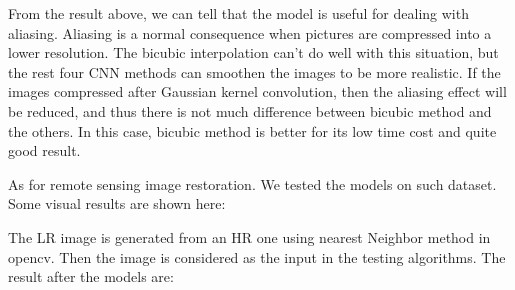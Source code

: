 \documentclass{article}
\begin{document}
  From the result above, we can tell that the model is useful for dealing with aliasing.
  Aliasing is a normal consequence when pictures are compressed into a lower resolution.
  The bicubic interpolation can't do well with this situation, 
  but the rest four CNN methods can smoothen the images to be more realistic.
  If the images compressed after Gaussian kernel convolution,
  then the aliasing effect will be reduced, and thus there is not much difference between bicubic method and the others.
  In this case, bicubic method is better for its low time cost and quite good result.
  
  As for remote sensing image restoration.
  We tested the models on such dataset. 
  Some visual results are shown here:

  The LR image is generated from an HR one using nearest Neighbor method in opencv.
  Then the image is considered as the input in the testing algorithms.
  The result after the models are:
\end{document}
